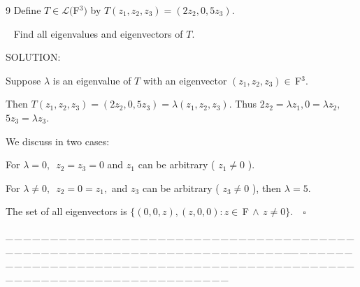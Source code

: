 \documentclass[a4paper, 11pt, UTF8]{article}
\def\Lm{\mathcal{L}}
\def\Fbfc{$\,{\timesbf F}$}
\begin{document}
\begin{large}
{\timesbf\Large 9} 
{\timessl\Large Define $T\in\Lm(${\timesbf F}$^3)$ by $T(z_1,z_2,z_3)=(2z_2, 0,5z_3)$.}\par\,\,\,
{\timessl\Large Find all eigenvalues and eigenvectors of $T$.
}\par
{\timesbf S\footnotesize{OLUTION:}}\par\quad
Suppose $\lambda$ is an eigenvalue of $T$ with an eigenvector $(z_1,z_2,z_3)\in\Fbfc^3.$\par\quad
Then $T(z_1,z_2,z_3)=(2z_2, 0,5z_3)=\lambda(z_1,z_2,z_3).$ Thus $2z_2=\lambda z_1,$\quad$0=\lambda z_2,$\quad$5z_3=\lambda z_3.$\par\quad
We discuss in two cases:\par\quad
For $\lambda=0,$\, $z_2=z_3=0$ and $z_1$ can be arbitrary ( $z_1\neq 0$ ).\par\quad
For $\lambda\neq 0,$\, $z_2=0=z_1,$ and $z_3$ can be arbitrary ( $z_3\neq 0$ ), then $\lambda=5$.\par\quad
The set of all eigenvectors is $\{(0,0,z),(z,0,0):z\in\Fbfc\,\wedge\,z\neq 0\}.\quad\square$\par
{\tiny \_\,\_\,\_\,\_\,\_\,\_\,\_\,\_\,\_\,\_\,\_\,\_\,\_\,\_\,\_\,\_\,\_\,\_\,\_\,\_\,\_\,\_\,\_\,\_\,\_\,\_\,\_\,\_\,\_\,\_\,\_\,\_\,\_\,\_\,\_\,\_\,\_\,\_\,\_\,\_\,\_\,\_\,\_\,\_\,\_\,\_\,\_\,\_\,\_\,\_\,\_\,\_\,\_\,\_\,\_\,\_\,\_\,\_\,\_\,\_\,\_\,\_\,\_\,\_\,\_\,\_\,\_\,\_\,\_\,\_\,\_\_\,\_\,\_\,\_\,\_\,\_\,\_\,\_\,\_\,\_\,\_\,\_\,\_\,\_\,\_\,\_\,\_\,\_\,\_\,\_\,\_\,\_\,\_\,\_\,\_\,\_\,\_\,\_\,\_\,\_\,\_\,\_\,\_\,\_\,\_\,\_\,\_\,\_\,\_\,\_\,\_\,\_\,\_\,\_\,\_\,\_\,\_\,\_\,\_\,\_\,\_\,\_\,\_\,\_\,\_\,\_\,\_\,\_\,\_\,\_\,\_\,\_\,\_\,\_\,\_\,\_\,\_\,\_\,\_\,\_\,\_}\par



\end{large}
\end{document}
